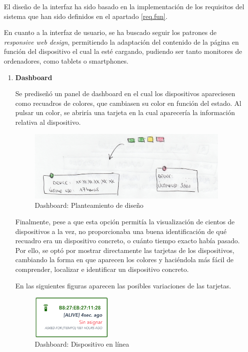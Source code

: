 El diseño de la interfaz ha sido basado en la implementación de los requisitos del sistema que han sido definidos en el apartado \ref{req.fun}.

En cuanto a la interfaz de usuario, se ha buscado seguir los patrones de \textit{responsive web design}, permitiendo la adaptación del contenido de la página en función del dispositivo el cual la esté cargando, pudiendo ser tanto monitores de ordenadores, como tablets o smartphones.

\begin{enumerate}

    \item \textbf{Dashboard} %
    
Se prediseñó un panel de dashboard en el cual los dispositivos apareciesen como recuadros de colores, que cambiasen su color en función del estado.
Al pulsar un color, se abriría una tarjeta en la cual aparecería la información relativa al dispositivo.

    \begin{figure}[H]
        \centering
        \includegraphics[width=10cm]{./img/web/devices/dev.pre.png}
        \caption{Dashboard: Planteamiento de diseño}
        \label{fig:devices.pre}
    \end{figure}

Finalmente, pese a  que esta opción permitía la visualización de cientos de dispositivos a la vez, no proporcionaba una buena identificación de qué recuadro era un dispositivo concreto, o cuánto tiempo exacto había pasado.
Por ello, se optó por mostrar directamente las tarjetas de los dispositivos, cambiando la forma en que aparecen los colores y haciéndola más fácil de comprender, localizar e identificar un dispositivo concreto.

En las siguientes figuras aparecen las posibles variaciones de las tarjetas.
    
    \begin{figure}[H]
        \centering
        \includegraphics[width=4cm]{./img/web/devices/dev.green.png}
        \caption{Dashboard: Dispositivo en línea}
        \label{fig:web.dir}
    \end{figure}
    

\end{enumerate}
